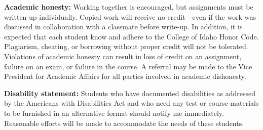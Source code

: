 \documentclass[11pt]{amsart}
\begin{document}

\textbf{Academic honesty:} Working together is encouraged, but assignments must be written up individually. Copied work will receive no credit---even if the work was discussed in collaboration with a classmate before write-up. In addition, it is expected that each student know and adhere to the College of Idaho Honor Code. 
Plagiarism, cheating, or borrowing without proper credit will not be tolerated. Violations of academic honesty can result in loss of credit on an assignment, failure on an exam, or failure in the course. A referral may be made to the Vice President for Academic Affairs for all parties involved in academic dishonesty.

\textbf{Disability statement:} Students who have documented disabilities as addressed by the Americans with Disabilities Act and who need any test or course materials to be furnished in an alternative format should notify me immediately. Reasonable efforts will be made to accommodate the needs of these students.
\end{document}

